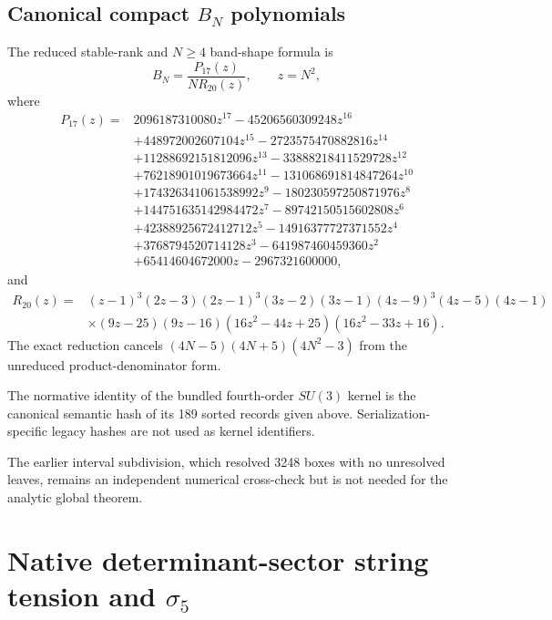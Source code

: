 \documentclass[11pt]{article}
\begin{document}
\subsection{Canonical compact $B_N$ polynomials}
\label{app:compactpolys}
The reduced stable-rank and $N\geq4$ band-shape formula is
\[
B_N=\frac{P_{17}(z)}{N R_{20}(z)},\qquad z=N^2,
\]
where
\begin{align*}
P_{17}(z)={}&2096187310080z^{17}-45206560309248z^{16}\\
&+448972002607104z^{15}-2723575470882816z^{14}\\
&+11288692151812096z^{13}-33888218411529728z^{12}\\
&+76218901019673664z^{11}-131068691814847264z^{10}\\
&+174326341061538992z^9-180230597250871976z^8\\
&+144751635142984472z^7-89742150515602808z^6\\
&+42388925672412712z^5-14916377727371552z^4\\
&+3768794520714128z^3-641987460459360z^2\\
&+65414604672000z-2967321600000,
\end{align*}
and
\begin{align*}
R_{20}(z)={}&(z-1)^3(2z-3)(2z-1)^3(3z-2)(3z-1)
(4z-9)^3(4z-5)(4z-1)\\
&\times(9z-25)(9z-16)(16z^2-44z+25)(16z^2-33z+16).
\end{align*}
The exact reduction cancels
$(4N-5)(4N+5)(4N^2-3)$ from the unreduced product-denominator form.

The normative identity of the bundled fourth-order $SU(3)$ kernel is the
canonical semantic hash of its 189 sorted records given above. Serialization-
specific legacy hashes are not used as kernel identifiers.

The earlier interval subdivision, which resolved 3248 boxes with no
unresolved leaves, remains an independent numerical cross-check but is not
needed for the analytic global theorem.

\section{Native determinant-sector string tension and $\sigma_5$}
\label{app:nativesigma}
\end{document}
